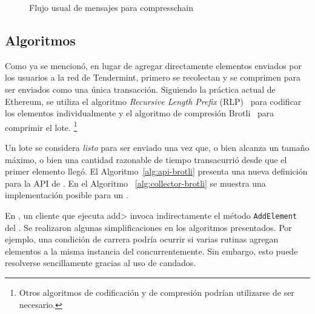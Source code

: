 \begin{figure}
  \caption{Flujo usual de mensajes para compresschain}
  \label{fig:compresschain-flow}
\end{figure}

\subsection{Algoritmos}


%
%

%

Como ya se mencionó, en lugar de agregar directamente elementos enviados por los usuarios a la red de Tendermint,
primero se recolectan y se comprimen para ser enviados como una única transacción.
Siguiendo la práctica actual de Ethereum, se utiliza el algoritmo
\textit{Recursive Length Prefix} (RLP)~\cite{ethereum} para codificar los elementos individualmente
y el algoritmo de compresión Brotli~\cite{brotli.compressor} para comprimir el lote.
\footnote{Otros algoritmos de codificación y de compresión podrían utilizarse de ser necesario.}

%
Un lote se considera \textit{listo} para ser enviado una vez que, o bien alcanza un tamaño máximo,
o bien una cantidad razonable de tiempo transacurrió desde que el primer elemento llegó. 
%
El Algoritmo~\ref{alg:api-brotli} presenta una nueva definición para la API de \setchain.
En el Algoritmo ~\ref{alg:collector-brotli} se muestra una implementación posible para un
\collector.





%
En \compresschain, un cliente que ejecuta \<add> invoca indirectamente el método \texttt{AddElement}
del \collector.
%
Se realizaron algunas simplificaciones en los algoritmos presentados. Por ejemplo, una condición de carrera
podría ocurrir si varias rutinas agregan elementos a la misma instancia del \collector concurrentemente.
Sin embargo, esto puede resolverse sencillamente gracias al uso de candados.


